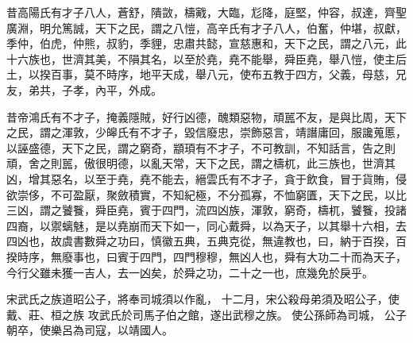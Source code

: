\documentclass{ctexart}
\begin{document}
昔高陽氏有才子八人，蒼舒，隤敳，檮戭，大臨，尨降，庭堅，仲容，叔達，齊聖廣淵，明允篤誠，天下之民，謂之八愷，高辛氏有才子八人，伯奮，仲堪，叔獻，季仲，伯虎，仲熊，叔豹，季貍，忠肅共懿，宣慈惠和，天下之民，謂之八元，此十六族也，世濟其美，不隕其名，以至於堯，堯不能舉，舜臣堯，舉八愷，使主后土，以揆百事，莫不時序，地平天成，舉八元，使布五教于四方，父義，母慈，兄友，弟共，子孝，內平，外成。

昔帝鴻氏有不才子，掩義隱賊，好行凶德，醜類惡物，頑嚚不友，是與比周，天下之民，謂之渾敦，少皞氏有不才子，毀信廢忠，崇飾惡言，靖譖庸回，服讒蒐慝，以誣盛德，天下之民，謂之窮奇，顓頊有不才子，不可教訓，不知話言，告之則頑，舍之則嚚，傲很明德，以亂天常，天下之民，謂之檮杌，此三族也，世濟其凶，增其惡名，以至于堯，堯不能去，縉雲氏有不才子，貪于飲食，冒于貨賄，侵欲崇侈，不可盈厭，聚斂積實，不知紀極，不分孤寡，不恤窮匱，天下之民，以比三凶，謂之饕餮，舜臣堯，賓于四門，流四凶族，渾敦，窮奇，檮杌，饕餮，投諸四裔，以禦螭魅，是以堯崩而天下如一，同心戴舜，以為天子，以其舉十六相，去四凶也，故虞書數舜之功曰，慎徽五典，五典克從，無違教也，曰，納于百揆，百揆時序，無廢事也，曰賓于四門，四門穆穆，無凶人也，舜有大功二十而為天子，今行父雖未獲一吉人，去一凶矣，於舜之功，二十之一也，庶幾免於戾乎。

宋武氏之族道昭公子，將奉司城須以作亂，
十二月，宋公殺母弟須及昭公子，使戴、莊、桓之族
攻武氏於司馬子伯之館，遂出武穆之族。
使公孫師為司城，
公子朝卒，使樂呂為司寇，以靖國人。
\end{document}
